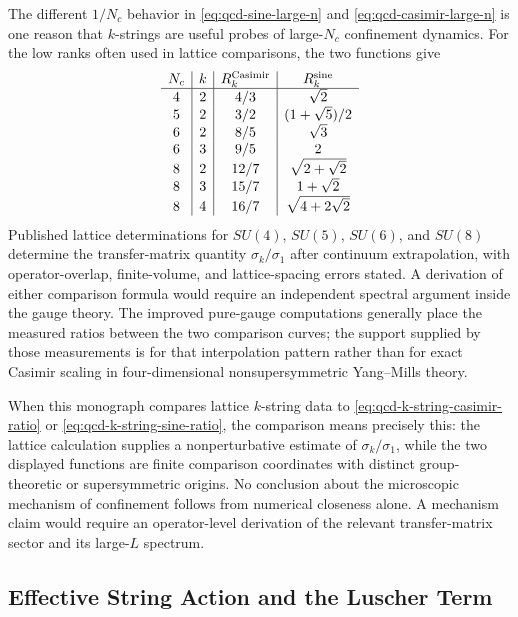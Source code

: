The different \(1/N_c\) behavior in
\eqref{eq:qcd-sine-large-n} and \eqref{eq:qcd-casimir-large-n} is one reason
that \(k\)-strings are useful probes of large-\(N_c\) confinement dynamics.
For the low ranks often used in lattice comparisons, the two functions give
\[
\begin{array}{c|c|c|c}
N_c & k & R_k^{\rm Casimir} & R_k^{\rm sine}\\
\hline
4 & 2 & 4/3 & \sqrt2\\
5 & 2 & 3/2 & (1+\sqrt5)/2\\
6 & 2 & 8/5 & \sqrt3\\
6 & 3 & 9/5 & 2\\
8 & 2 & 12/7 & \sqrt{2+\sqrt2}\\
8 & 3 & 15/7 & 1+\sqrt2\\
8 & 4 & 16/7 & \sqrt{4+2\sqrt2}
\end{array}
\]
Published lattice determinations for \(SU(4)\), \(SU(5)\), \(SU(6)\), and
\(SU(8)\) determine the transfer-matrix quantity \(\sigma_k/\sigma_1\) after
continuum extrapolation, with operator-overlap, finite-volume, and
lattice-spacing errors stated.  A derivation of either comparison formula
would require an independent spectral argument inside the gauge theory.  The
improved pure-gauge computations generally place the measured ratios between
the two comparison curves; the support supplied by those measurements is for
that interpolation pattern rather than for exact Casimir scaling in
four-dimensional nonsupersymmetric Yang--Mills theory.

\begin{controlledapproximation}
\label{ca:qcd-k-string-comparison-formulas}
When this monograph compares lattice \(k\)-string data to
\eqref{eq:qcd-k-string-casimir-ratio} or
\eqref{eq:qcd-k-string-sine-ratio}, the comparison means precisely this:
the lattice calculation supplies a nonperturbative estimate of
\(\sigma_k/\sigma_1\), while the two displayed functions are finite
comparison coordinates with distinct group-theoretic or supersymmetric
origins.  No conclusion about the microscopic mechanism of confinement
follows from numerical closeness alone.  A mechanism claim would require an
operator-level derivation of the relevant transfer-matrix sector and its
large-\(L\) spectrum.
\end{controlledapproximation}

\subsection{Effective String Action and the Luscher Term}

